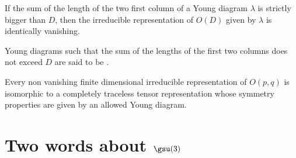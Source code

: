 \begin{theorem}
If the sum of the length of the two first column of a Young diagram $\lambda$ is strictly bigger than $D$, then the irreducible representation of $O(D)$ given by $\lambda$ is identically vanishing.
\end{theorem}

Young diagrams such that the sum of the lengths of the first two columns does not exceed $D$ are said to be .

\begin{theorem}		\label{ThoOpqrepreTens}
Every non vanishing finite dimensional irreducible representation of $O(p,q)$ is isomorphic to a completely traceless tensor representation whose symmetry properties are given by an allowed Young diagram.
\end{theorem}

\section{Two words about \texorpdfstring{$\gsu(3)$}{su3}}

